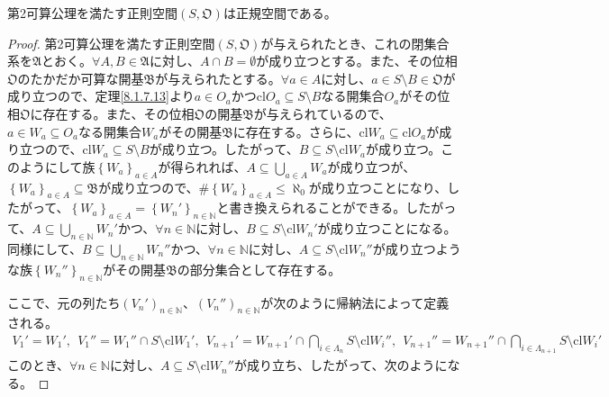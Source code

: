 \documentclass[dvipdfmx]{jsarticle}
\begin{document}
\begin{thm}\label{8.1.7.17}
第2可算公理を満たす正則空間$\left( S,\mathfrak{O} \right)$は正規空間である。
\end{thm}
\begin{proof}
第2可算公理を満たす正則空間$\left( S,\mathfrak{O} \right)$が与えられたとき、これの閉集合系を$\mathfrak{A}$とおく。$\forall A,B \in \mathfrak{A}$に対し、$A \cap B = \emptyset$が成り立つとする。また、その位相$\mathfrak{O}$のたかだか可算な開基$\mathfrak{B}$が与えられたとする。$\forall a \in A$に対し、$a \in S \setminus B \in \mathfrak{O}$が成り立つので、定理\ref{8.1.7.13}より$a \in O_{a}$かつ${\mathrm{cl}}O_{a} \subseteq S \setminus B$なる開集合$O_{a}$がその位相$\mathfrak{O}$に存在する。また、その位相$\mathfrak{O}$の開基$\mathfrak{B}$が与えられているので、$a \in W_{a} \subseteq O_{a}$なる開集合$W_{a}$がその開基$\mathfrak{B}$に存在する。さらに、${\mathrm{cl}}W_{a} \subseteq {\mathrm{cl}}O_{a}$が成り立つので、${\mathrm{cl}}W_{a} \subseteq S \setminus B$が成り立つ。したがって、$B \subseteq S \setminus {\mathrm{cl}}W_{a}$が成り立つ。このようにして族$\left\{ W_{a} \right\}_{a \in A}$が得られれば、$A \subseteq \bigcup_{a \in A} W_{a}$が成り立つが、$\left\{ W_{a} \right\}_{a \in A}\subseteq \mathfrak{B}$が成り立つので、${\#}\left\{ W_{a} \right\}_{a \in A} \leq \aleph_{0}$が成り立つことになり、したがって、$\left\{ W_{a} \right\}_{a \in A} = \left\{ W_{n}' \right\}_{n \in \mathbb{N}}$と書き換えられることができる。したがって、$A \subseteq \bigcup_{n \in \mathbb{N}} W_{n}'$かつ、$\forall n \in \mathbb{N}$に対し、$B \subseteq S \setminus {\mathrm{cl}}W_{n}'$が成り立つことになる。同様にして、$B \subseteq \bigcup_{n \in \mathbb{N}} W_{n}''$かつ、$\forall n \in \mathbb{N}$に対し、$A \subseteq S \setminus {\mathrm{cl}}W_{n}''$が成り立つような族$\left\{ W_{n}'' \right\}_{n \in \mathbb{N}}$がその開基$\mathfrak{B}$の部分集合として存在する。\par
ここで、元の列たち$\left( V_{n}' \right)_{n \in \mathbb{N}}$、$\left( V_{n}'' \right)_{n \in \mathbb{N}}$が次のように帰納法によって定義される。
\begin{align*}
V_{1}' = W_{1}',\ \ V_{1}'' = W_{1}'' \cap S \setminus {\mathrm{cl}}W_{1}',\ \ V_{n + 1}' = W_{n + 1}' \cap \bigcap_{i \in \varLambda_{n}} {S \setminus {\mathrm{cl}}W_{i}''},\ \ V_{n + 1}'' = W_{n + 1}'' \cap \bigcap_{i \in \varLambda_{n + 1}} {S \setminus {\mathrm{cl}}W_{i}'}
\end{align*}
このとき、$\forall n \in \mathbb{N}$に対し、$A \subseteq S \setminus {\mathrm{cl}}W_{n}''$が成り立ち、したがって、次のようになる。

\end{proof}
\end{document}
